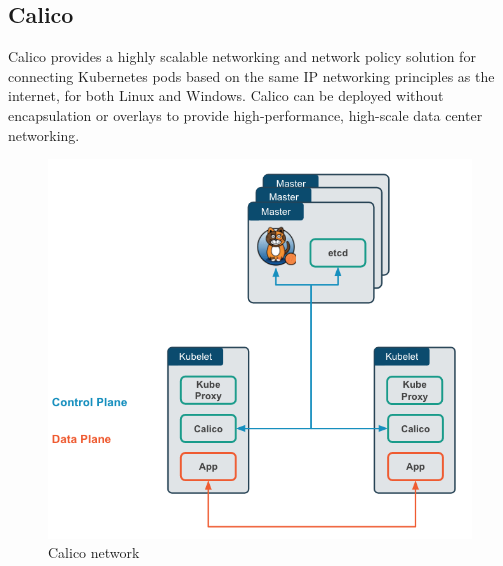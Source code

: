 \documentclass[12pt]{report}
\begin{document}
\subsection{Calico}
Calico provides a highly scalable networking and network policy solution for connecting Kubernetes pods based on the same IP networking principles as the internet, for both Linux and Windows. Calico can be deployed without encapsulation or overlays to provide high-performance, high-scale data center networking.\\
\begin{figure}[h!]
	\begin{center}
		\includegraphics[totalheight=0.42\textheight]{calico}
		\caption{Calico network \cite{Calico}}
	\end{center}
\end{figure}
\end{document}
